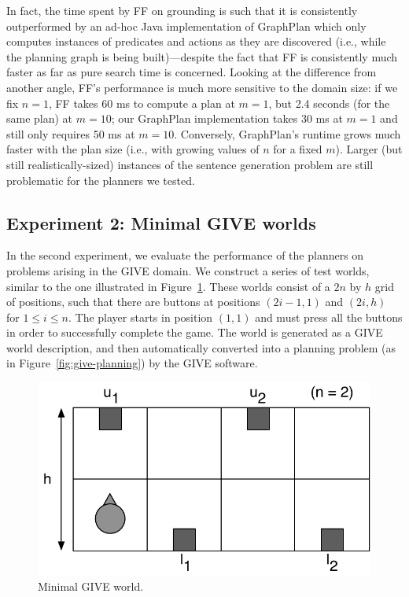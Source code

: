 In fact, the time spent by FF on grounding is such that it is consistently
outperformed by an ad-hoc Java implementation of GraphPlan which only
computes instances of predicates and actions as they are discovered (i.e.,
while the planning graph is being built)---despite the fact that FF is
consistently much faster as far as pure search time is concerned.  Looking
at the difference from another angle, FF's performance is much more
sensitive to the domain size: if we fix $n=1$, FF takes 60 ms to compute a
plan at $m=1$, but 2.4 seconds (for the same plan) at $m=10$; our GraphPlan
implementation takes 30 ms at $m=1$ and still only requires 50 ms at
$m=10$.  Conversely, GraphPlan's runtime grows much faster with the plan
size (i.e., with growing values of $n$ for a fixed $m$).  Larger (but still
realistically-sized) instances of the sentence generation problem are still
problematic for the planners we tested.


\subsection{Experiment 2: Minimal GIVE worlds}
\label{sec:exper-2:-minim}

In the second experiment, we evaluate the performance of the planners
on problems arising in the GIVE domain. We construct a series of test
worlds, similar to the one illustrated in
Figure~\ref{fig:give-minimal}. These worlds consist of a $2n$ by $h$
grid of positions, such that there are buttons at positions $(2i-1,1)$
and $(2i,h)$ for $1 \leq i \leq n$. The player starts in position $(1,1)$
and must press all the buttons in order to successfully complete the game.
The world is generated as a GIVE world description, and then automatically
converted into a planning problem (as in Figure~\ref{fig:give-planning}) by
the GIVE software.

\begin{figure}
  \centering
  \includegraphics[width=0.8\columnwidth]{pic-buttons}
  \caption{Minimal GIVE world.}
  \label{fig:give-minimal}
\end{figure}

